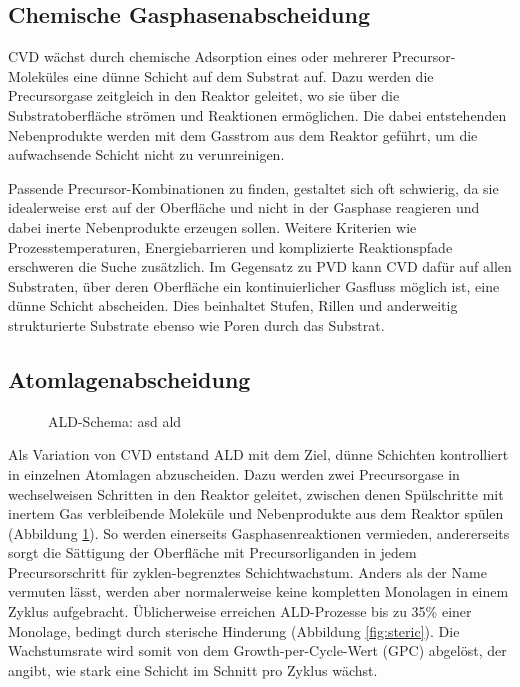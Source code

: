 \subsection{Chemische Gasphasenabscheidung}

CVD wächst durch chemische Adsorption eines oder mehrerer Precursor-Moleküles eine dünne Schicht auf dem Substrat auf.
Dazu werden die Precursorgase zeitgleich in den Reaktor geleitet, wo sie über die Substratoberfläche strömen und Reaktionen ermöglichen.
Die dabei entstehenden Nebenprodukte werden mit dem Gasstrom aus dem Reaktor geführt, um die aufwachsende Schicht nicht zu verunreinigen.

Passende Precursor-Kombinationen zu finden, gestaltet sich oft schwierig, da sie idealerweise erst auf der Oberfläche und nicht in der Gasphase reagieren und dabei inerte Nebenprodukte erzeugen sollen.
Weitere Kriterien wie Prozesstemperaturen, Energiebarrieren und komplizierte Reaktionspfade erschweren die Suche zusätzlich.
Im Gegensatz zu PVD kann CVD dafür auf allen Substraten, über deren Oberfläche ein kontinuierlicher Gasfluss möglich ist, eine dünne Schicht abscheiden.
Dies beinhaltet Stufen, Rillen und anderweitig strukturierte Substrate ebenso wie Poren durch das Substrat.


\subsection{Atomlagenabscheidung}

\begin{figure}
  \centering
  \def\svgwidth{\textwidth}
  
  \caption[ALD-Schema]{ALD-Schema: asd ald}
  \label{fig:ald-schema}
\end{figure}

Als Variation von CVD entstand ALD  mit dem Ziel, dünne Schichten kontrolliert in einzelnen Atomlagen abzuscheiden.
Dazu werden zwei Precursorgase in wechselweisen Schritten in den Reaktor geleitet, zwischen denen Spülschritte mit inertem Gas verbleibende Moleküle und Nebenprodukte aus dem Reaktor spülen (Abbildung \ref{fig:ald-schema}).
So werden einerseits Gasphasenreaktionen vermieden, andererseits sorgt die Sättigung  der Oberfläche mit Precursorliganden in jedem Precursorschritt für zyklen-begrenztes Schichtwachstum.
Anders als der Name vermuten lässt, werden aber normalerweise keine kompletten Monolagen in einem Zyklus aufgebracht.
Üblicherweise erreichen ALD-Prozesse bis zu 35\%  einer Monolage, bedingt durch sterische Hinderung (Abbildung \ref{fig:steric}).
Die Wachstumsrate wird somit von dem Growth-per-Cycle-Wert (GPC) abgelöst, der angibt, wie stark eine Schicht im Schnitt pro Zyklus wächst.

